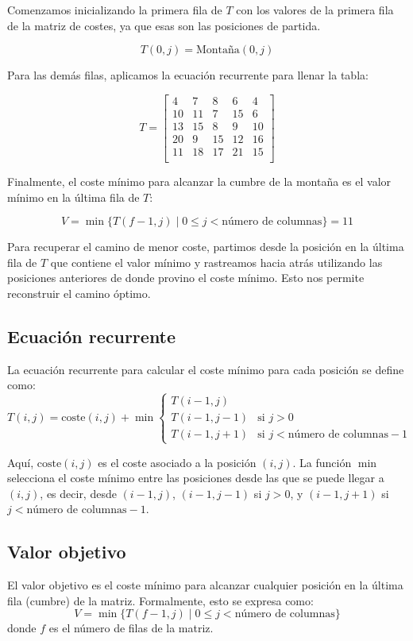 Comenzamos inicializando la primera fila de $T$ con los valores de la primera fila de la matriz de costes, ya que esas son las posiciones de partida.

\[
T(0, j) = \text{Montaña}(0, j)
\]

Para las demás filas, aplicamos la ecuación recurrente para llenar la tabla:

\[
T = \begin{bmatrix}
4 & 7 & 8 & 6 & 4 \\
10 & 11 & 7 & 15 & 6 \\
13 & 15 & 8 & 9 & 10 \\
20 & 9 & 15 & 12 & 16 \\
11 & 18 & 17 & 21 & 15 \\
\end{bmatrix}
\]

Finalmente, el coste mínimo para alcanzar la cumbre de la montaña es el valor mínimo en la última fila de $T$:

\[
V = \min \{ T(f-1, j) \mid 0 \leq j < \text{número de columnas} \} = 11
\]

Para recuperar el camino de menor coste, partimos desde la posición en la última fila de $T$ que contiene el valor mínimo y rastreamos hacia atrás utilizando las posiciones anteriores de donde provino el coste mínimo. Esto nos permite reconstruir el camino óptimo.
\subsection{Ecuación recurrente}
La ecuación recurrente para calcular el coste mínimo para cada posición se define como:
\[
T(i, j) = \text{coste}(i, j) + \min \begin{cases} 
T(i-1, j) \\
T(i-1, j-1) & \text{si } j > 0 \\
T(i-1, j+1) & \text{si } j < \text{número de columnas} - 1 
\end{cases}
\]

Aquí, $\text{coste}(i, j)$ es el coste asociado a la posición $(i, j)$. La función $\min$ selecciona el coste mínimo entre las posiciones desde las que se puede llegar a $(i, j)$, es decir, desde $(i-1, j)$, $(i-1, j-1)$ si $j > 0$, y $(i-1, j+1)$ si $j < \text{número de columnas} - 1$.

\subsection{Valor objetivo}
El valor objetivo es el coste mínimo para alcanzar cualquier posición en la última fila (cumbre) de la matriz. Formalmente, esto se expresa como:
\[
V = \min \{ T(f-1, j) \mid 0 \leq j < \text{número de columnas} \}
\]
donde $f$ es el número de filas de la matriz.

